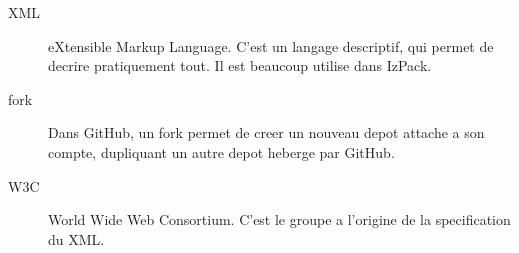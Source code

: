 \begin{description}
	\item[XML] eXtensible Markup Language. C'est un langage descriptif, qui permet de decrire pratiquement tout. Il est beaucoup utilise dans IzPack.
	\item[fork] Dans GitHub, un fork permet de creer un nouveau depot attache a son compte, dupliquant un autre depot heberge par GitHub.
	\item[W3C] World Wide Web Consortium. C'est le groupe a l'origine de la specification du XML.
\end{description}
